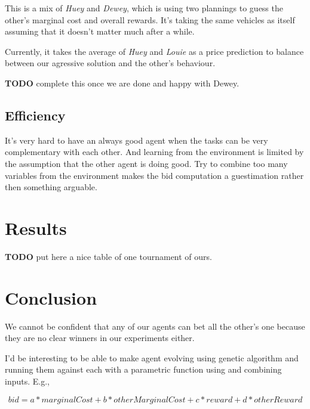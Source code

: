 \documentclass[11pt,a4paper]{article}
\begin{document}
This is a mix of \emph{Huey} and \emph{Dewey}, which is using two plannings
to guess the other's marginal cost and overall rewards. It's taking the same
vehicles as itself assuming that it doesn't matter much after a while.

Currently, it takes the average of \emph{Huey} and \emph{Louie} as a price
prediction to balance between our agressive solution and the other's behaviour.

\textbf{TODO} complete this once we are done and happy with Dewey.

\subsection*{Efficiency}

It's very hard to have an always good agent when the tasks can be very
complementary with each other. And learning from the environment is limited by
the assumption that the other agent is doing good. Try to combine too many
variables from the environment makes the bid computation a guestimation rather
then something arguable.


\section*{Results}

\textbf{TODO} put here a nice table of one tournament of ours.


\section*{Conclusion}

We cannot be confident that any of our agents can bet all the other's one
because they are no clear winners in our experiments either.

I'd be interesting to be able to make agent evolving using genetic algorithm
and running them against each with a parametric function using and combining
inputs. E.g.,

$$bid = a * marginalCost + b * otherMarginalCost + c * reward + d * otherReward$$
\end{document}
